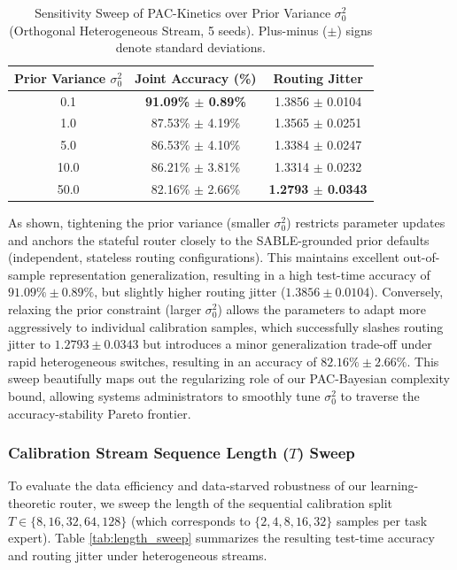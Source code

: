 \begin{table}[tb]
\centering
\caption{Sensitivity Sweep of PAC-Kinetics over Prior Variance $\sigma_0^2$ (Orthogonal Heterogeneous Stream, 5 seeds). Plus-minus ($\pm$) signs denote standard deviations.}
\label{tab:sigma_sweep}
\vskip 0.1in
\begin{tabular}{ccc}
\toprule
Prior Variance $\sigma_0^2$ & Joint Accuracy (\%) & Routing Jitter \\
\midrule
0.1 & \textbf{91.09\% $\pm$ 0.89\%} & 1.3856 $\pm$ 0.0104 \\
1.0 & 87.53\% $\pm$ 4.19\% & 1.3565 $\pm$ 0.0251 \\
5.0 & 86.53\% $\pm$ 4.10\% & 1.3384 $\pm$ 0.0247 \\
10.0 & 86.21\% $\pm$ 3.81\% & 1.3314 $\pm$ 0.0232 \\
50.0 & 82.16\% $\pm$ 2.66\% & \textbf{1.2793 $\pm$ 0.0343} \\
\bottomrule
\end{tabular}
\end{table}

As shown, tightening the prior variance (smaller $\sigma_0^2$) restricts parameter updates and anchors the stateful router closely to the SABLE-grounded prior defaults (independent, stateless routing configurations). This maintains excellent out-of-sample representation generalization, resulting in a high test-time accuracy of $91.09\% \pm 0.89\%$, but slightly higher routing jitter ($1.3856 \pm 0.0104$). Conversely, relaxing the prior constraint (larger $\sigma_0^2$) allows the parameters to adapt more aggressively to individual calibration samples, which successfully slashes routing jitter to $1.2793 \pm 0.0343$ but introduces a minor generalization trade-off under rapid heterogeneous switches, resulting in an accuracy of $82.16\% \pm 2.66\%$. This sweep beautifully maps out the regularizing role of our PAC-Bayesian complexity bound, allowing systems administrators to smoothly tune $\sigma_0^2$ to traverse the accuracy-stability Pareto frontier.

\subsubsection{Calibration Stream Sequence Length ($T$) Sweep}
To evaluate the data efficiency and data-starved robustness of our learning-theoretic router, we sweep the length of the sequential calibration split $T \in \{8, 16, 32, 64, 128\}$ (which corresponds to $\{2, 4, 8, 16, 32\}$ samples per task expert). Table \ref{tab:length_sweep} summarizes the resulting test-time accuracy and routing jitter under heterogeneous streams.

